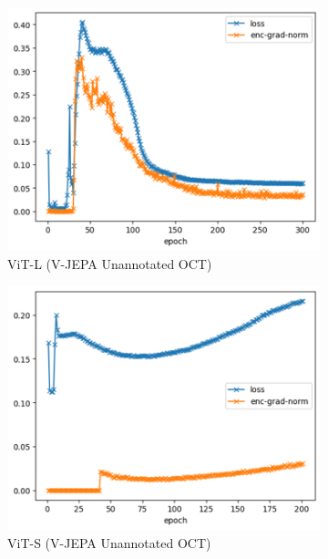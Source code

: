 \documentclass[a4paper,11pt,oneside]{report}
\begin{document}
\begin{figure}[hbt]
    \centering
    \begin{subfigure}[t]{0.3\textwidth}
        \centering
        \includegraphics[width=0.9\linewidth]{figures/discussion_vjepa_training_1.png}
        \caption{ViT-L (V-JEPA Unannotated OCT)}
    \end{subfigure}%
    \begin{subfigure}[t]{0.3\textwidth}
        \centering
        \includegraphics[width=0.9\linewidth]{figures/discussion_vjepa_training_2.png}
        \caption{ViT-S (V-JEPA Unannotated OCT)}
    \end{subfigure}%
    \begin{subfigure}[t]{0.3\textwidth}
        \centering

\end{subfigure}
\end{figure}
\end{document}
